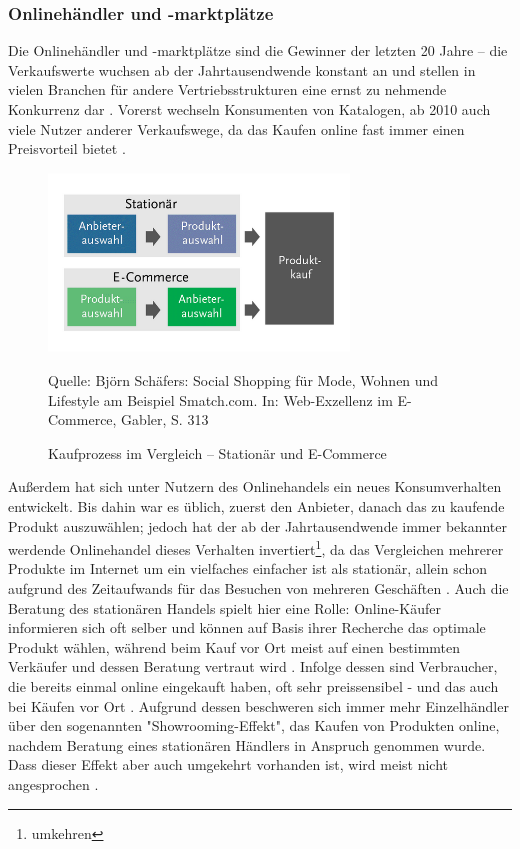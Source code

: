 \documentclass[a4paper, 12pt]{scrartcl}
\makeatletter
\newcommand*{\bildquelle}{%
  \footnotesize Quelle:
}
\newenvironment{folding}{\endgroup}{\begingroup \def \@currenvir{folding}\edef \@currenvline{\on@line}}
\makeatother
\begin{document}
\begin{folding} \subsubsection{Onlinehändler und -marktplätze}

Die Onlinehändler und -marktplätze sind die Gewinner der letzten 20 Jahre – die Verkaufswerte wuchsen ab der Jahrtausendwende konstant an und stellen in vielen Branchen für andere Vertriebsstrukturen eine ernst zu nehmende Konkurrenz dar \cite{wolf}. Vorerst wechseln Konsumenten von Katalogen, ab 2010 auch viele Nutzer anderer Verkaufswege, da das Kaufen online fast immer einen Preisvorteil bietet \cite[S. 31]{Graf}.
\begin{figure}[h]
    \begin{center}
        \includegraphics[width=8cm]{media/Fabian-konsumwandel.png}
        \caption{Kaufprozess im Vergleich – Stationär und E-Commerce}
        \label{konsumwandel}
        \bildquelle Björn Schäfers: Social Shopping für Mode, Wohnen und Lifestyle am Beispiel Smatch.com. In: Web-Exzellenz im E-Commerce, Gabler, S. 313 %
    \end{center}
\end{figure} 
Außerdem hat sich unter Nutzern des Onlinehandels ein neues Konsumverhalten entwickelt. Bis dahin war es üblich, zuerst den Anbieter, danach das zu kaufende Produkt auszuwählen; jedoch hat der ab der Jahrtausendwende immer bekannter werdende Onlinehandel dieses Verhalten invertiert\footnote{umkehren}, da das Vergleichen mehrerer Produkte im Internet um ein vielfaches einfacher ist als stationär, allein schon aufgrund des Zeitaufwands für das Besuchen von mehreren Geschäften \cite[S 22f]{Graf}. Auch die Beratung des stationären Handels spielt hier eine Rolle: Online-Käufer informieren sich oft selber und können auf Basis ihrer Recherche das optimale Produkt wählen, während beim Kauf vor Ort meist auf einen bestimmten Verkäufer und dessen Beratung vertraut wird \cite[S. 15f]{evilcom}. Infolge dessen sind Verbraucher, die bereits einmal online eingekauft haben, oft sehr preissensibel - und das auch bei Käufen vor Ort \cite[S. 60]{Nitt}. Aufgrund dessen beschweren sich immer mehr Einzelhändler über den sogenannten "Showrooming-Effekt", das Kaufen von Produkten online, nachdem Beratung eines stationären Händlers in Anspruch genommen wurde. Dass dieser Effekt aber auch umgekehrt vorhanden ist, wird meist nicht angesprochen \cite[S. 21f]{evilcom}.

\end{folding}
\end{document}
